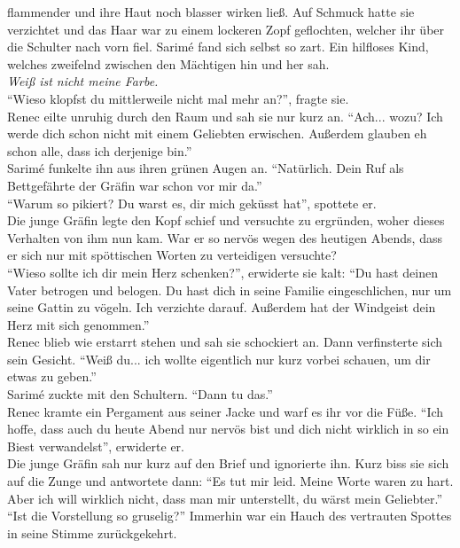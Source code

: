 flammender und ihre Haut noch blasser wirken ließ. Auf Schmuck hatte sie verzichtet und das Haar 
war zu einem lockeren Zopf geflochten, welcher ihr über die Schulter nach vorn fiel. Sarimé fand 
sich selbst so zart. Ein hilfloses Kind, welches zweifelnd zwischen den Mächtigen hin und her sah.\\
\textit{Weiß ist nicht meine Farbe.}\\
``Wieso klopfst du mittlerweile nicht mal mehr an?'', fragte sie.\\
Renec eilte unruhig durch den Raum und sah sie nur kurz an. ``Ach... wozu? Ich werde dich schon 
nicht mit einem Geliebten erwischen. Außerdem glauben eh schon alle, dass ich derjenige bin.''\\
Sarimé funkelte ihn aus ihren grünen Augen an. ``Natürlich. Dein Ruf als Bettgefährte der Gräfin 
war schon vor mir da.''\\
``Warum so pikiert? Du warst es, dir mich geküsst hat'', spottete er.\\
Die junge Gräfin legte den Kopf schief und versuchte zu ergründen, woher dieses Verhalten von ihm 
nun kam. War er so nervös wegen des heutigen Abends, dass er sich nur mit spöttischen Worten zu 
verteidigen versuchte?\\
``Wieso sollte ich dir mein Herz schenken?'', erwiderte sie kalt: ``Du hast deinen Vater betrogen 
und belogen. Du hast dich in seine Familie eingeschlichen, nur um seine Gattin zu vögeln. Ich 
verzichte darauf. Außerdem hat der Windgeist dein Herz mit sich genommen.''\\
Renec blieb wie erstarrt stehen und sah sie schockiert an. Dann verfinsterte sich sein Gesicht. 
``Weiß du... ich wollte eigentlich nur kurz vorbei schauen, um dir etwas zu geben.''\\
Sarimé zuckte mit den Schultern. ``Dann tu das.''\\
Renec kramte ein Pergament aus seiner Jacke und warf es ihr vor die Füße. ``Ich hoffe, dass auch du 
heute Abend nur nervös bist und dich nicht wirklich in so ein Biest verwandelst'', erwiderte er.\\
Die junge Gräfin sah nur kurz auf den Brief und ignorierte ihn. Kurz biss sie sich auf die Zunge 
und antwortete dann: ``Es tut mir leid. Meine Worte waren zu hart. Aber ich will wirklich nicht, 
dass man mir unterstellt, du wärst mein Geliebter.''\\
``Ist die Vorstellung so gruselig?'' Immerhin war ein Hauch des vertrauten Spottes in seine Stimme 
zurückgekehrt.\\
